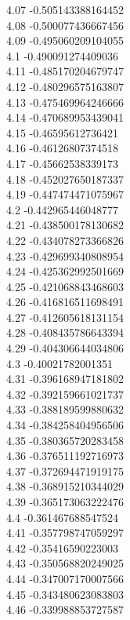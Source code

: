 {4.07	-0.505143388164452\\
4.08	-0.500077436667456\\
4.09	-0.495060209104055\\
4.1	-0.490091274409036\\
4.11	-0.485170204679747\\
4.12	-0.480296575163807\\
4.13	-0.475469964246666\\
4.14	-0.470689953439041\\
4.15	-0.46595612736421\\
4.16	-0.46126807374518\\
4.17	-0.45662538339173\\
4.18	-0.452027650187337\\
4.19	-0.447474471075967\\
4.2	-0.442965446048777\\
4.21	-0.438500178130682\\
4.22	-0.434078273366826\\
4.23	-0.429699340808954\\
4.24	-0.425362992501669\\
4.25	-0.421068843468603\\
4.26	-0.416816511698491\\
4.27	-0.412605618131154\\
4.28	-0.408435786643394\\
4.29	-0.404306644034806\\
4.3	-0.40021782001351\\
4.31	-0.396168947181802\\
4.32	-0.392159661021737\\
4.33	-0.388189599880632\\
4.34	-0.384258404956506\\
4.35	-0.380365720283458\\
4.36	-0.376511192716973\\
4.37	-0.372694471919175\\
4.38	-0.368915210344029\\
4.39	-0.365173063222476\\
4.4	-0.361467688547524\\
4.41	-0.357798747059297\\
4.42	-0.35416590223003\\
4.43	-0.350568820249025\\
4.44	-0.347007170007566\\
4.45	-0.343480623083803\\
4.46	-0.339988853727587\\
}
